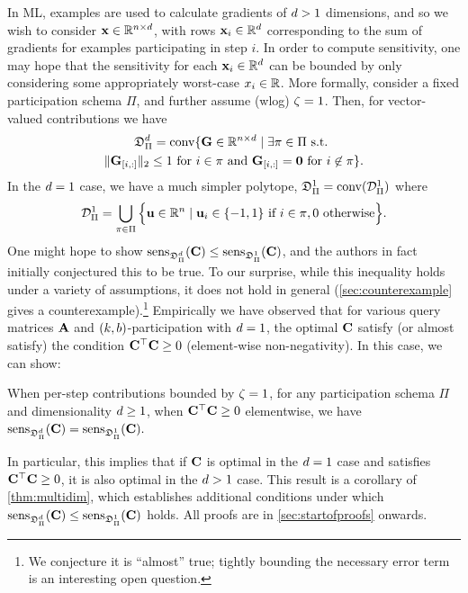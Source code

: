 \documentclass{article} %
\theoremstyle{named}
\begin{document}
In ML, examples are used to calculate gradients of $d>1$ dimensions, and so we wish to consider $\mathbf{x} \in \mathbb{R}^{n\times d}$, with rows $\mathbf{x}_i \in \mathbb{R}^d$ corresponding to the sum of gradients for examples participating in step $i$.
In order to compute sensitivity, one may hope %
that the sensitivity for each $\mathbf{x}_i \in \mathbb{R}^{d}$ can be bounded by only considering some appropriately worst-case $x_i \in \mathbb{R}$. More formally, consider a fixed participation schema $\Pi$, and further assume (wlog) $\zeta=1$. Then, for vector-valued contributions we have
\begin{multline*}
\mathfrak{D}^d_\Pi = \operatorname{conv}\{\mathbf{G} \in \mathbb{R}^{n \times d} \mid 
   \exists \pi \in \Pi \text{ s.t. } \\
      \| \mathbf{G}_{[i, :]} \|_2 \le 1 \text { for $i \in \pi$ and } \mathbf{G}_{[i, :]} = \textbf{0} \text { for $i \not\in \pi$} \}.
\end{multline*}
In the $d=1$ case, we have a much simpler polytope, $\mathfrak{D}^1_\Pi = \operatorname{conv}(\mathcal{D}^1_\Pi)$ where
\[
\mathcal{D}^1_\Pi = \bigcup_{\pi \in \Pi} \Big\{ \mathbf{u} \in \mathbb{R}^{n} \mid \mathbf{u}_i \in \{-1, 1\} \text{ if } i \in \pi, 0 \text{ otherwise}\Big\}.
\]
One might hope to show $\operatorname{sens}_{\mathfrak{D}^d_\Pi}(\mathbf{C}) \le \operatorname{sens}_{\mathfrak{D}^1_\Pi}(\mathbf{C})$, and the authors in fact initially conjectured this to be true. To our surprise, while this inequality holds under a variety of assumptions, it does not hold in general (\cref{sec:counterexample} gives a counterexample).\footnote{We conjecture it is ``almost'' true; tightly bounding the necessary error term is an interesting open question.} 
Empirically we have observed that for various query matrices $\mathbf{A}$ and $(k,b)$-participation with $d=1$, the optimal $\mathbf{C}$ satisfy (or almost satisfy) the condition $\mathbf{C}^\top \mathbf{C} \ge 0$ (element-wise non-negativity). In this case, we can show:

\begin{cor}\label{cor:matrix_to_vector_sens}
When per-step contributions bounded by $\zeta=1$, for any participation schema $\Pi$ and dimensionality $d \ge 1$, when $\mathbf{C}^\top\mathbf{C} \ge 0$ elementwise, we have
$
\operatorname{sens}_{\mathfrak{D}^d_\Pi}(\mathbf{C}) = \operatorname{sens}_{\mathfrak{D}^1_\Pi}(\mathbf{C}).
$
\end{cor}

In particular, this implies that if $\mathbf{C}$ is optimal in the $d=1$ case and satisfies $\mathbf{C}^\top\mathbf{C} \ge 0$, it is also optimal in the $d > 1$ case. This result is a corollary of \cref{thm:multidim}, which establishes additional conditions under which $\operatorname{sens}_{\mathfrak{D}^d_\Pi}(\mathbf{C}) \le \operatorname{sens}_{\mathfrak{D}^1_\Pi}(\mathbf{C})$ holds. All proofs are in \cref{sec:startofproofs} onwards.%
\end{document}
